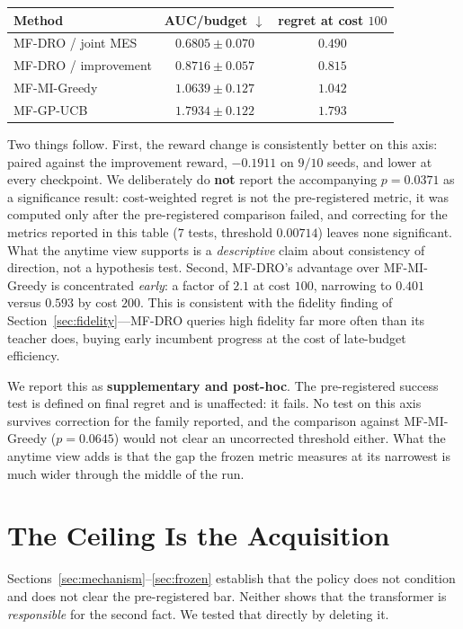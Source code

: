 \documentclass[11pt]{article}
\begin{document}
\begin{center}
\begin{tabular}{lcc}
\toprule
Method & AUC/budget $\downarrow$ & regret at cost $100$ \\
\midrule
MF-DRO / joint MES     & $\mathbf{0.6805 \pm 0.070}$ & $\mathbf{0.490}$ \\
MF-DRO / improvement   & $0.8716 \pm 0.057$ & $0.815$ \\
MF-MI-Greedy           & $1.0639 \pm 0.127$ & $1.042$ \\
MF-GP-UCB              & $1.7934 \pm 0.122$ & $1.793$ \\
\bottomrule
\end{tabular}
\end{center}

Two things follow. First, the reward change is consistently better on this axis:
paired against the improvement reward, $-0.1911$ on $9/10$ seeds, and lower at
every checkpoint. We deliberately do \textbf{not} report the accompanying
$p = 0.0371$ as a significance result: cost-weighted regret is not the
pre-registered metric, it was computed only after the pre-registered comparison
failed, and correcting for the metrics reported in this table
($7$ tests, threshold $0.00714$) leaves none significant. What the anytime view
supports is a \emph{descriptive} claim about consistency of direction, not a
hypothesis test. Second, MF-DRO's advantage over MF-MI-Greedy is concentrated
\emph{early}: a factor of $2.1$ at cost $100$, narrowing to $0.401$ versus
$0.593$ by cost $200$. This is consistent with the fidelity finding of
Section~\ref{sec:fidelity}---MF-DRO queries high fidelity far more often than its
teacher does, buying early incumbent progress at the cost of late-budget
efficiency.

We report this as \textbf{supplementary and post-hoc}. The pre-registered success
test is defined on final regret and is unaffected: it fails. No test on this
axis survives correction for the family reported, and the comparison against
MF-MI-Greedy ($p = 0.0645$) would not clear an uncorrected threshold either. What the anytime view adds is that the gap the
frozen metric measures at its narrowest is much wider through the middle of the
run.

\section{The Ceiling Is the Acquisition}
\label{sec:ceiling}

Sections~\ref{sec:mechanism}--\ref{sec:frozen} establish that the policy does not
condition and does not clear the pre-registered bar. Neither shows that the
transformer is \emph{responsible} for the second fact. We tested that directly by
deleting it.
\end{document}
